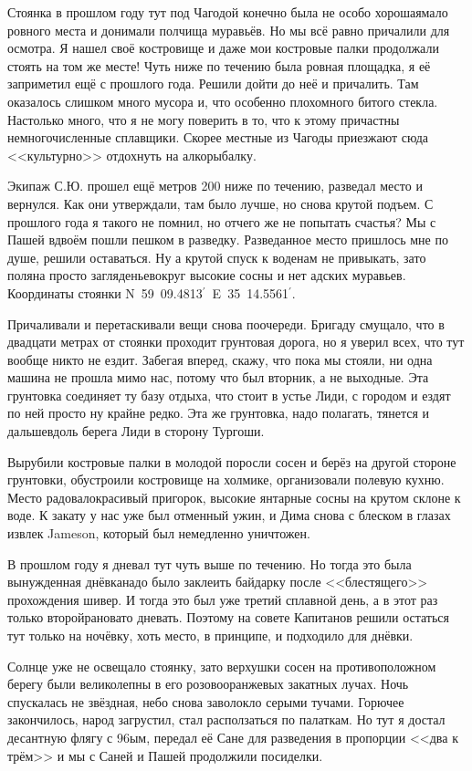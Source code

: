 Стоянка в прошлом году тут под Чагодой конечно была не особо хорошая\mdash  мало ровного места и донимали полчища муравьёв. Но мы всё равно причалили для осмотра. Я нашел своё костровище и даже мои костровые палки продолжали стоять на том же месте! Чуть ниже по течению была ровная площадка, я её заприметил ещё с прошлого года. Решили дойти до неё и причалить. Там оказалось слишком много мусора и, что особенно плохо\mdash  много битого стекла. Настолько много, что я не могу поверить в то, что к этому причастны немногочисленные сплавщики. Скорее местные из Чагоды приезжают сюда <<культурно>> отдохнуть на алкорыбалку. 

Экипаж С.Ю. прошел ещё метров 200 ниже по течению, разведал место и вернулся. Как они утверждали, там было лучше, но снова крутой подъем. С прошлого года я такого не помнил, но отчего же не попытать счастья? Мы с Пашей вдвоём пошли пешком в разведку. Разведанное место пришлось мне по душе, решили оставаться. Ну а крутой спуск к воде\mdash  нам не привыкать, зато поляна просто загляденье\mdash  вокруг высокие сосны и нет адских муравьев. Координаты стоянки N~59\degree~09.4813$^\prime$~E~35\degrees~14.5561$^\prime$.

Причаливали и перетаскивали вещи снова по\sdash очереди. Бригаду смущало, что в двадцати метрах от стоянки проходит грунтовая дорога, но я уверил всех, что тут вообще никто не ездит. Забегая вперед, скажу, что пока мы стояли, ни одна машина не прошла мимо нас, потому что был вторник, а не выходные. Эта грунтовка соединяет ту базу отдыха, что стоит в устье Лиди, с городом и ездят по ней просто ну крайне редко. Эта же грунтовка, надо полагать, тянется и дальше\mdash вдоль берега Лиди в сторону Тургоши.

Вырубили костровые палки в молодой поросли сосен и берёз на другой стороне грунтовки, обустроили костровище на холмике, организовали полевую кухню. Место радовало\mdash красивый пригорок, высокие янтарные сосны на крутом склоне к воде. К закату у нас уже был отменный ужин, и Дима снова с блеском в глазах извлек Jameson, который был немедленно уничтожен. 

В прошлом году я дневал тут чуть выше по течению. Но тогда это была вынужденная днёвка\mdash  надо было заклеить байдарку после <<блестящего>> прохождения шивер. И тогда это был уже третий сплавной день, а в этот раз только второй\mdash  рановато дневать. Поэтому на совете Капитанов решили остаться тут только на ночёвку, хоть место, в принципе, и подходило для днёвки.

Солнце уже не освещало стоянку, зато верхушки сосен на противоположном берегу были великолепны в его розово\sdash оранжевых закатных лучах. Ночь спускалась не звёздная, небо снова заволокло серыми тучами. Горючее закончилось, народ загрустил, стал расползаться по палаткам. Но тут я достал десантную флягу с 96\sdash ым, передал её Сане для разведения в пропорции <<два к трём>> и мы с Саней и Пашей продолжили посиделки. 

